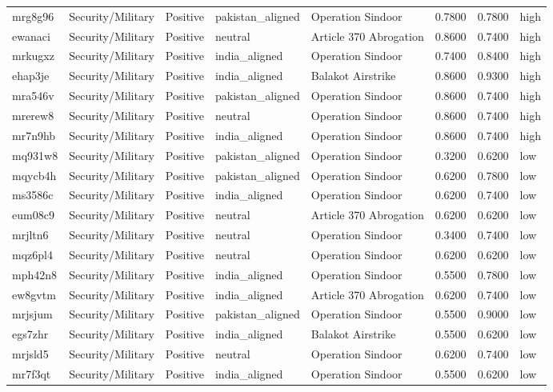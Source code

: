 \begin{longtable}{lllllrrl}
mrg8g96 & Security/Military & Positive & pakistan\_aligned & Operation Sindoor & 0.7800 & 0.7800 & high \\
ewanaci & Security/Military & Positive & neutral & Article 370 Abrogation & 0.8600 & 0.7400 & high \\
mrkugxz & Security/Military & Positive & india\_aligned & Operation Sindoor & 0.7400 & 0.8400 & high \\
ehap3je & Security/Military & Positive & india\_aligned & Balakot Airstrike & 0.8600 & 0.9300 & high \\
mra546v & Security/Military & Positive & pakistan\_aligned & Operation Sindoor & 0.8600 & 0.7400 & high \\
mrerew8 & Security/Military & Positive & neutral & Operation Sindoor & 0.8600 & 0.7400 & high \\
mr7n9hb & Security/Military & Positive & india\_aligned & Operation Sindoor & 0.8600 & 0.7400 & high \\
mq931w8 & Security/Military & Positive & pakistan\_aligned & Operation Sindoor & 0.3200 & 0.6200 & low \\
mqycb4h & Security/Military & Positive & pakistan\_aligned & Operation Sindoor & 0.6200 & 0.7800 & low \\
ms3586c & Security/Military & Positive & india\_aligned & Operation Sindoor & 0.6200 & 0.7400 & low \\
eum08c9 & Security/Military & Positive & neutral & Article 370 Abrogation & 0.6200 & 0.6200 & low \\
mrjltn6 & Security/Military & Positive & neutral & Operation Sindoor & 0.3400 & 0.7400 & low \\
mqz6pl4 & Security/Military & Positive & neutral & Operation Sindoor & 0.6200 & 0.6200 & low \\
mph42n8 & Security/Military & Positive & india\_aligned & Operation Sindoor & 0.5500 & 0.7800 & low \\
ew8gvtm & Security/Military & Positive & india\_aligned & Article 370 Abrogation & 0.6200 & 0.7400 & low \\
mrjsjum & Security/Military & Positive & pakistan\_aligned & Operation Sindoor & 0.5500 & 0.9000 & low \\
egs7zhr & Security/Military & Positive & india\_aligned & Balakot Airstrike & 0.5500 & 0.6200 & low \\
mrjsld5 & Security/Military & Positive & neutral & Operation Sindoor & 0.6200 & 0.7400 & low \\
mr7f3qt & Security/Military & Positive & india\_aligned & Operation Sindoor & 0.5500 & 0.6200 & low \\

\end{longtable}
